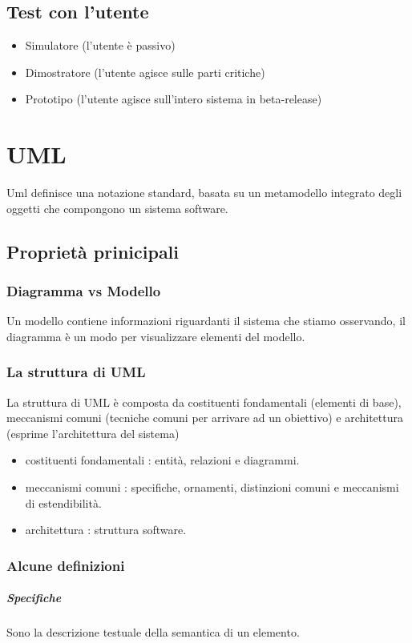 \documentclass[a4paper,12pt]{report}
\begin{document}
	\section{Test con l'utente}
	\begin{itemize}
		\item Simulatore (l'utente è passivo)
		\item Dimostratore (l'utente agisce sulle parti critiche)
		\item Prototipo (l'utente agisce sull'intero sistema in beta-release)
	\end{itemize}
	\chapter{UML}
	Uml definisce una notazione standard, basata su un metamodello integrato degli oggetti che compongono un sistema software.
	\section{Proprietà prinicipali}
	\subsection{Diagramma vs Modello}
	Un modello contiene informazioni riguardanti il sistema che stiamo osservando, il diagramma è un modo per visualizzare elementi del modello.
	\subsection{La struttura di UML}
	La struttura di UML è composta da costituenti fondamentali (elementi di base), meccanismi comuni (tecniche comuni per arrivare ad un obiettivo) e architettura (esprime l'architettura del sistema)
	\begin{itemize}
		\item costituenti fondamentali : entità, relazioni e diagrammi.
		\item meccanismi comuni : specifiche, ornamenti, distinzioni comuni e meccanismi di estendibilità.
		\item architettura : struttura software.
	\end{itemize}
	\subsection{Alcune definizioni}
	\paragraph{Specifiche} Sono la descrizione testuale della semantica di un elemento.
\end{document}
